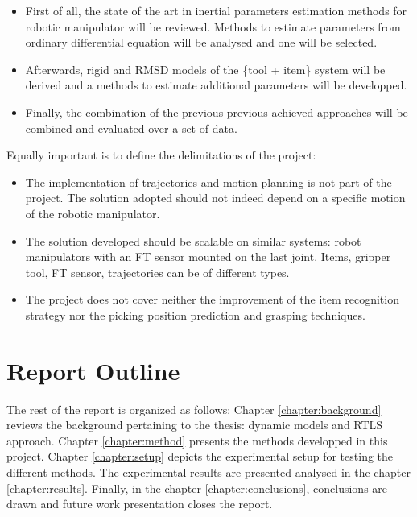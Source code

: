 \documentclass[/home/francois/latex/report/main.tex]{subfiles}
\begin{document}
\begin{itemize}
	\item First of all, the state of the art in inertial parameters estimation methods for robotic manipulator will be reviewed. Methods to estimate parameters from ordinary differential equation will be analysed and one will be selected.
	\item Afterwards, rigid and \ac{RMSD} models of the \{tool + item\} system will be derived and a methods to estimate additional parameters will be developped.
	\item Finally, the combination of the previous previous achieved approaches will be combined and evaluated over a set of data.
\end{itemize}

Equally important is to define the delimitations of the project:

\begin{itemize}
	\item The implementation of trajectories and motion planning is not part of the project. The solution adopted should not indeed depend on a specific motion of the robotic manipulator.
	\item The solution developed should be scalable on similar systems: robot manipulators with an \ac{FT} sensor mounted on the last joint. Items, gripper tool, \ac{FT} sensor, trajectories can be of different types.
	\item The project does not cover neither the improvement of the item recognition strategy nor the picking position prediction and grasping techniques.
\end{itemize}


\section{Report Outline}

The rest of the report is organized as follows: Chapter \ref{chapter:background} reviews the background pertaining to the thesis: dynamic models and \ac{RTLS} approach. Chapter \ref{chapter:method} presents the methods developped in this project. Chapter \ref{chapter:setup} depicts the experimental setup for testing the different methods. The experimental results are presented analysed in the chapter \ref{chapter:results}. Finally, in the chapter \ref{chapter:conclusions}, conclusions are drawn and future work presentation closes the report.
\end{document}

